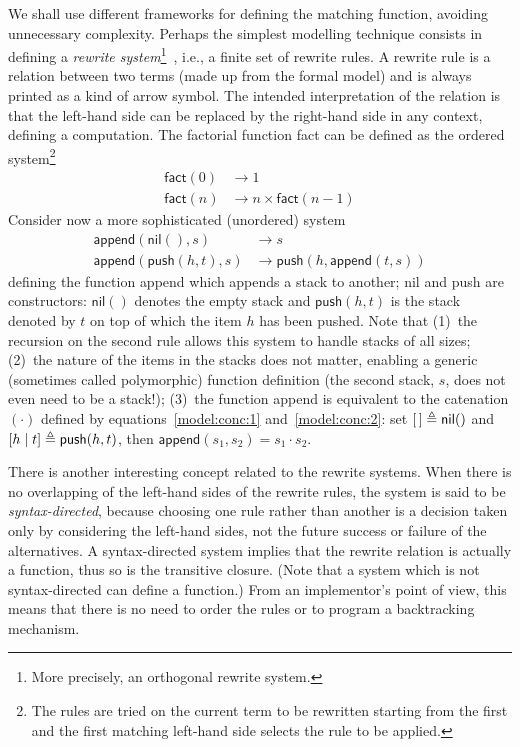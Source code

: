 We shall use different frameworks for defining the matching function,
avoiding unnecessary complexity. Perhaps the simplest modelling
technique consists in defining a \emph{rewrite system}\footnote{More
precisely, an orthogonal rewrite system.}~\cite{HTCS:1990}, i.e., a
finite set of rewrite rules. A rewrite rule is a relation between two
terms (made up from the formal model) and is always printed as a kind
of arrow symbol. The intended interpretation of the relation is that
the left\hyp{}hand side can be replaced by the right\hyp{}hand side in
any context, defining a computation. The factorial function
\textsf{fact} can be defined as the ordered system\footnote{The rules
are tried on the current term to be rewritten starting from the first
and the first matching left\hyp{}hand side selects the rule to be
applied.}
\begin{align*}
\textsf{fact}(0) &\rightarrow 1\\
\textsf{fact}(n) &\rightarrow n \times \textsf{fact}(n-1)
\end{align*}
Consider now a more sophisticated (unordered) system 
\begin{align*}
\textsf{append}(\textsf{nil}(), s) &\rightarrow s\\
\textsf{append}(\textsf{push}(h,t), s) &\rightarrow 
\textsf{push}(h, \textsf{append}(t, s))
\end{align*}
defining the function \textsf{append} which appends a stack to
another; \textsf{nil} and \textsf{push} are constructors:
\(\textsf{nil}()\) denotes the empty stack and \(\textsf{push}(h, t)\)
is the stack denoted by \(t\) on top of which the item \(h\) has been
pushed. Note that (1)~the recursion on the second rule allows this
system to handle stacks of all sizes; (2)~the nature of the items in
the stacks does not matter, enabling a generic (sometimes called
polymorphic) function definition (the second stack, \(s\), does not
even need to be a stack!); (3)~the function \textsf{append} is
equivalent to the catenation \((\cdot)\) defined by
equations~\eqref{model:conc:1} and~\eqref{model:conc:2}: set \([\,]
\triangleq \textsf{nil}()\) and \([{h}\mid{t}] \triangleq
\textsf{push}(h, t)\), then \(\textsf{append}(s_1, s_2) = s_1 \cdot
s_2\).

There is another interesting concept related to the rewrite
systems. When there is no overlapping of the left\hyp{}hand sides of
the rewrite rules, the system is said to be
\emph{syntax\hyp{}directed}, because choosing one rule rather than
another is a decision taken only by considering the left\hyp{}hand
sides, not the future success or failure of the alternatives. A
syntax\hyp{}directed system implies that the rewrite relation is
actually a function, thus so is the transitive closure. (Note that a
system which is not syntax\hyp{}directed can define a function.) From
an implementor's point of view, this means that there is no need to
order the rules or to program a backtracking mechanism.

